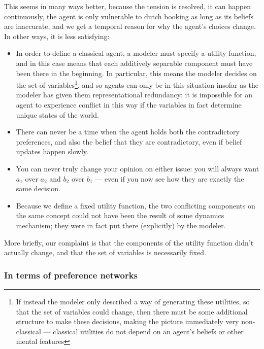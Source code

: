 \documentclass{article}
\begin{document}
	This seems in many ways better, because the tension is resolved, it can happen continuously, the agent is only vulnerable to dutch booking as long as its beliefs are inaccurate, and we get a temporal reason for why the agent's choices change. In other ways, it is less satisfying:
	\begin{itemize}%
		\item In order to define a classical agent, a modeler must specify a utility function, and in this case means that each additively separable component must have been there in the beginning. In particular, this means the modeler decides on the set of variables\footnote{If instead the modeler only described a way of generating these utilities, so that the set of variables could change, then there must be some additional structure to make these decisions, making the picture immediately very non-classical --- classical utilities do not depend on an agent's beliefs or other mental features}, and so agents can only be in this situation insofar as the modeler has given them representational redundancy: it is impossible for an agent to experience conflict in this way if the variables in fact determine unique states of the world.
		
		\item There can never be a time when the agent holds both the contradictory preferences, and also the belief that they are contradictory, even if belief updates happen slowly.		
		
		\item You can never truly change your opinion on either issue: you will always want $a_1$ over $a_2$ and $b_2$ over $b_1$ --- even if you now see how they are exactly the same decision.
		
		\item Because we define a fixed utility function, the two conflicting components on the same concept could not have been the result of some dynamics mechanism; they were in fact put there (explicitly) by the modeler. 
	\end{itemize}
	
	More briefly, our complaint is that the components of the utility function didn't actually change, and that the set of variables is necessarily fixed.
	
	\subsubsection{In terms of preference networks}
	
\end{document}
